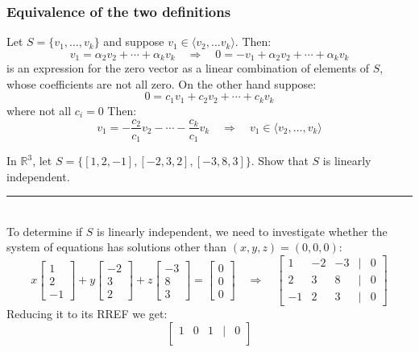 \documentclass[a4paper, 9pt]{extarticle}
\begin{document}
\subsubsection*{Equivalence of the two definitions}
Let $S = \{v_1, \dots, v_k\}$ and suppose $v_1 \in \langle v_2, \dots v_k \rangle$. Then:
$$
  v_1 = \alpha_2 v_2 + \cdots + \alpha_k v_k \quad \Rightarrow \quad
  0 = - v_1 + \alpha_2 v_2 + \cdots + \alpha_k v_k
$$
is an expression for the zero vector as a linear combination of elements of $S$, whose coefficients are not all zero. On the other hand suppose:
$$
  0 = c_1v_1 + c_2v_2 + \cdots + c_kv_k
$$
where not all $c_i = 0$ Then:
$$
  v_1 = -\frac{c_2}{c_1}v_2 - \cdots - \frac{c_k}{c_1}v_k \quad \Rightarrow \quad
  v_1 \in \langle v_2, \dots, v_k \rangle
$$
\begin{examplebox}{}{}
  In $\mathbb{R}^3$, let $S = \{[1,2,-1], [-2, 3, 2], [-3,8,3]\}$. Show that $S$ is linearly independent.
  \\[2ex] \rule{\textwidth}{1px} \\
  To determine if $S$ is linearly independent, we need to investigate whether the system of equations has solutions other than $(x,y,z) = (0,0,0)$:
  $$ x \begin{bmatrix}
      1 \\
      2 \\
      -1
    \end{bmatrix}
    + y \begin{bmatrix}
      -2 \\
      3  \\
      2
    \end{bmatrix}
    + z \begin{bmatrix}
      -3 \\
      8  \\
      3
    \end{bmatrix}
    =
    \begin{bmatrix}
      0 \\
      0 \\
      0
    \end{bmatrix}
    \quad\Longrightarrow \quad
    \begin{bmatrix}
      1  & -2 & -3 & | & 0 \\
      2  & 3  & 8  & | & 0 \\
      -1 & 2  & 3  & | & 0
    \end{bmatrix}
  $$
  Reducing it to its RREF we get:
  $$
    \begin{bmatrix}
      1 & 0 & 1 & | & 0 \\

\end{bmatrix}$$
\end{examplebox}
\end{document}
